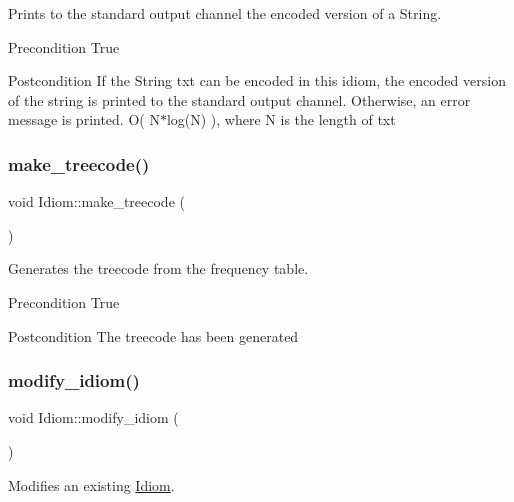 Prints to the standard output channel the encoded version of a String. 

\begin{DoxyPrecond}{Precondition}
True 
\end{DoxyPrecond}
\begin{DoxyPostcond}{Postcondition}
If the String txt can be encoded in this idiom, the encoded version of the string is printed to the standard output channel. Otherwise, an error message is printed.  O( N$\ast$log(\+N) ), where N is the length of txt 
\end{DoxyPostcond}
\mbox{\label{classIdiom_adf84ec3e906a170e6f4c6415a07eb300}} 
\subsubsection{\texorpdfstring{make\+\_\+treecode()}{make\_treecode()}}
{\footnotesize\ttfamily void Idiom\+::make\+\_\+treecode (\begin{DoxyParamCaption}{ }\end{DoxyParamCaption})}



Generates the treecode from the frequency table. 

\begin{DoxyPrecond}{Precondition}
True 
\end{DoxyPrecond}
\begin{DoxyPostcond}{Postcondition}
The treecode has been generated 
\end{DoxyPostcond}
\mbox{\label{classIdiom_ac9e8c47f009912c613b4b3337ad664d6}} 
\subsubsection{\texorpdfstring{modify\+\_\+idiom()}{modify\_idiom()}}
{\footnotesize\ttfamily void Idiom\+::modify\+\_\+idiom (\begin{DoxyParamCaption}{ }\end{DoxyParamCaption})}



Modifies an existing \hyperlink{classIdiom}{Idiom}. 

